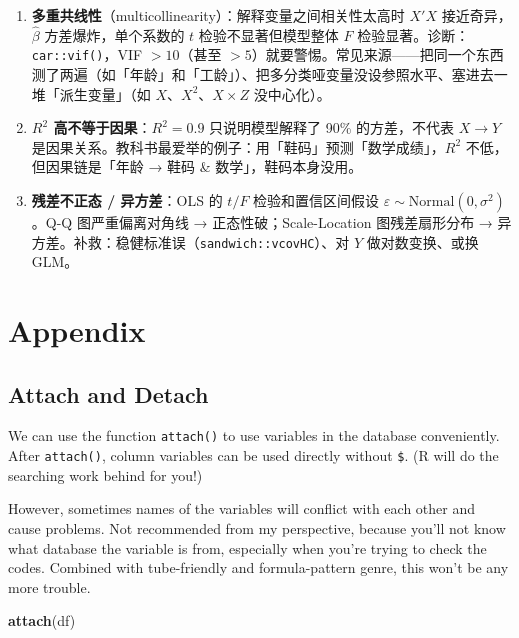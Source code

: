 \documentclass[
]{ctexart}
\newenvironment{Shaded}{\begin{snugshade}}{\end{snugshade}}
\newcommand{\FunctionTok}[1]{\textcolor[rgb]{0.13,0.29,0.53}{\textbf{#1}}}
\newcommand{\NormalTok}[1]{#1}
\begin{document}
\begin{pitfall}[新手容易栽的三件事]
\begin{enumerate}
\item \textbf{多重共线性}（multicollinearity）：解释变量之间相关性太高时 $X'X$ 接近奇异，$\hat\beta$ 方差爆炸，单个系数的 $t$ 检验不显著但模型整体 $F$ 检验显著。诊断：\texttt{car::vif()}，VIF $> 10$（甚至 $> 5$）就要警惕。常见来源——把同一个东西测了两遍（如「年龄」和「工龄」）、把多分类哑变量没设参照水平、塞进去一堆「派生变量」（如 $X$、$X^2$、$X \times Z$ 没中心化）。
\item \textbf{$R^2$ 高不等于因果}：$R^2 = 0.9$ 只说明模型解释了 90\% 的方差，不代表 $X \to Y$ 是因果关系。教科书最爱举的例子：用「鞋码」预测「数学成绩」，$R^2$ 不低，但因果链是「年龄 → 鞋码 \& 数学」，鞋码本身没用。
\item \textbf{残差不正态 / 异方差}：OLS 的 $t/F$ 检验和置信区间假设 $\varepsilon \sim \mathrm{Normal}(0, \sigma^2)$。Q-Q 图严重偏离对角线 → 正态性破；Scale-Location 图残差扇形分布 → 异方差。补救：稳健标准误（\texttt{sandwich::vcovHC}）、对 $Y$ 做对数变换、或换 GLM。
\end{enumerate}
\end{pitfall}

\hypertarget{appendix}{%
\section{Appendix}\label{appendix}}

\hypertarget{attach-and-detach}{%
\subsection{Attach and Detach}\label{attach-and-detach}}

We can use the function \texttt{attach()} to use variables in the
database conveniently. After \texttt{attach()}, column variables can be
used directly without \texttt{\$}. (R will do the searching work behind
for you!)

However, sometimes names of the variables will conflict with each other
and cause problems. Not recommended from my perspective, because you'll
not know what database the variable is from, especially when you're
trying to check the codes. Combined with tube-friendly and
formula-pattern genre, this won't be any more trouble.

\begin{Shaded}
\begin{Highlighting}[]
\FunctionTok{attach}\NormalTok{(df)}
\end{Highlighting}
\end{Shaded}
\end{document}
